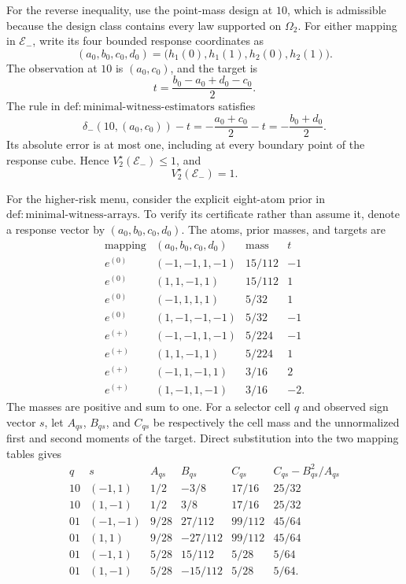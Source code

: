 For the reverse inequality, use the point-mass design at \(10\), which is
admissible because the design class contains every law supported on
\(\Omega_2\).  For either mapping in \(\mathcal E_-\), write its four
bounded response coordinates as
\[
 (a_0,b_0,c_0,d_0)
 =\bigl(h_1(0),h_1(1),h_2(0),h_2(1)\bigr).
\]
The observation at \(10\) is \((a_0,c_0)\), and the target is
\[
 t=\frac{b_0-a_0+d_0-c_0}{2}.
\]
The rule in \(\mathrm{def{:}minimal\text{-}witness\text{-}estimators}\)
satisfies
\[
 \delta_-(10,(a_0,c_0))-t
 =-\frac{a_0+c_0}{2}-t
 =-\frac{b_0+d_0}{2}.
\]
Its absolute error is at most one, including at every boundary point of the
response cube.  Hence \(V_2^\star(\mathcal E_-)\le1\), and
\[
 V_2^\star(\mathcal E_-)=1. \tag{1}
\]

For the higher-risk menu, consider the explicit eight-atom prior in
\(\mathrm{def{:}minimal\text{-}witness\text{-}arrays}\).  To verify its
certificate rather than assume it, denote a response vector by
\((a_0,b_0,c_0,d_0)\).  The atoms, prior masses, and targets are
\[
\begin{array}{c|c|c|c}
\text{mapping}&(a_0,b_0,c_0,d_0)&\text{mass}&t\\ \hline
e^{(0)}&(-1,-1,1,-1)&15/112&-1\\
e^{(0)}&(1,1,-1,1)&15/112&1\\
e^{(0)}&(-1,1,1,1)&5/32&1\\
e^{(0)}&(1,-1,-1,-1)&5/32&-1\\
e^{(+)}&(-1,-1,1,-1)&5/224&-1\\
e^{(+)}&(1,1,-1,1)&5/224&1\\
e^{(+)}&(-1,1,-1,1)&3/16&2\\
e^{(+)}&(1,-1,1,-1)&3/16&-2.
\end{array}
\]
The masses are positive and sum to one.  For a selector cell \(q\) and
observed sign vector \(s\), let \(A_{qs}\), \(B_{qs}\), and \(C_{qs}\)
be respectively the cell mass and the unnormalized first and second moments
of the target.  Direct substitution into the two mapping tables gives
\[
\begin{array}{c|c|c|c|c|c}
q&s&A_{qs}&B_{qs}&C_{qs}&C_{qs}-B_{qs}^2/A_{qs}\\ \hline
10&(-1,1)&1/2&-3/8&17/16&25/32\\
10&(1,-1)&1/2&3/8&17/16&25/32\\ \hline
01&(-1,-1)&9/28&27/112&99/112&45/64\\
01&(1,1)&9/28&-27/112&99/112&45/64\\
01&(-1,1)&5/28&15/112&5/28&5/64\\
01&(1,-1)&5/28&-15/112&5/28&5/64.
\end{array}
\]
